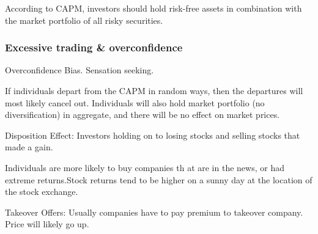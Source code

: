 \documentclass[english, 12pt]{article}
\begin{document}
According to CAPM, investors should hold risk-free assets in combination with the market portfolio of all risky securities.
\subsubsection{Excessive trading \& overconfidence}
Overconfidence Bias. Sensation seeking.

If individuals depart from the CAPM in random ways, then the departures will most likely cancel out. Individuals will also hold market portfolio (no diversification) in aggregate, and there will be no effect on market prices.

Disposition Effect: Investors holding on to losing stocks and selling stocks that made a gain.

Individuals are more likely to buy companies th at are in the news, or had extreme returns.Stock returns tend to be higher on a sunny day at the location of the stock exchange.

Takeover Offers: Usually companies have to pay premium to takeover company. Price will likely go up.

\end{document}
